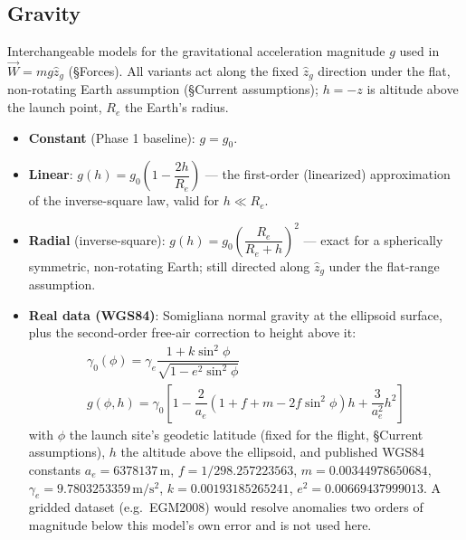 \documentclass[10pt]{extarticle}
\numberwithin{equation}{subsubsection}
\begin{document}
\subsection{Gravity}
Interchangeable models for the gravitational acceleration magnitude $g$ used in
$\vec{W} = mg\hat{z}_g$ (\S Forces). All variants act along the fixed $\hat{z}_g$ direction under
the flat, non-rotating Earth assumption (\S Current assumptions); $h = -z$ is altitude above the
launch point, $R_e$ the Earth's radius.
\begin{itemize}
    \item \textbf{Constant} (Phase 1 baseline): $g = g_0$.
    \item \textbf{Linear}: $g(h) = g_0\left(1 - \dfrac{2h}{R_e}\right)$ --- the first-order
    (linearized) approximation of the inverse-square law, valid for $h \ll R_e$.
    \item \textbf{Radial} (inverse-square): $g(h) = g_0\left(\dfrac{R_e}{R_e + h}\right)^2$ ---
    exact for a spherically symmetric, non-rotating Earth; still directed along $\hat{z}_g$ under
    the flat-range assumption.
    \item \textbf{Real data (WGS84)}: Somigliana normal gravity at the ellipsoid surface, plus the
    second-order free-air correction to height above it:
    \begin{gather}
        \gamma_0(\phi) = \gamma_e\dfrac{1+k\sin^2\phi}{\sqrt{1-e^2\sin^2\phi}} \\
        g(\phi, h) = \gamma_0\left[1 - \dfrac{2}{a_e}\left(1+f+m-2f\sin^2\phi\right)h + \dfrac{3}{a_e^2}h^2\right]
    \end{gather}
    with $\phi$ the launch site's geodetic latitude (fixed for the flight, \S Current assumptions),
    $h$ the altitude above the ellipsoid, and published WGS84 constants $a_e = 6378137\,\mathrm{m}$,
    $f = 1/298.257223563$, $m = 0.00344978650684$, $\gamma_e = 9.7803253359\,\mathrm{m/s^2}$,
    $k = 0.00193185265241$, $e^2 = 0.00669437999013$. A gridded dataset (e.g.\ EGM2008) would
    resolve anomalies two orders of magnitude below this model's own error and is not used here.
\end{itemize}
\end{document}
